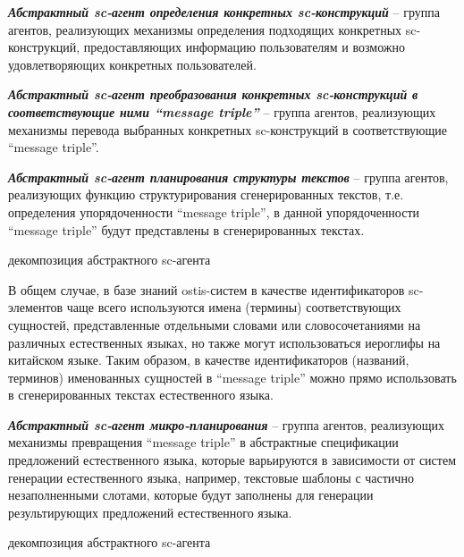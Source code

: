 \textit{\textbf{Абстрактный sc-агент определения конкретных sc-конструкций}} -- группа агентов, реализующих механизмы определения подходящих конкретных sc-конструкций, предоставляющих информацию пользователям и возможно удовлетворяющих конкретных пользователей. 

\textit{\textbf{Абстрактный sc-агент преобразования конкретных sc-конструкций в соответствующие ними ``message triple''}} -- группа агентов, реализующих механизмы перевода выбранных конкретных sc-конструкций в соответствующие ``message triple''.

\textit{\textbf{Абстрактный sc-агент планирования структуры текстов}} -- группа агентов, реализующих функцию структурирования сгенерированных текстов, т.е. определения упорядоченности ``message triple'', в данной упорядоченности ``message triple'' будут представлены в сгенерированных текстах. 
\begin{SCn}
	\begin{scnrelfromset}{декомпозиция абстрактного sc-агента}
	\end{scnrelfromset}
\end{SCn}

В общем случае, в базе знаний ostis-систем в качестве идентификаторов sc-элементов чаще всего используются имена (термины) соответствующих сущностей, представленные отдельными словами или словосочетаниями на различных естественных языках, но также могут использоваться иероглифы на китайском языке. Таким образом, в качестве идентификаторов (названий, терминов) именованных сущностей в ``message triple'' можно прямо использовать в сгенерированных текстах естественного языка. 

\textit{\textbf{Абстрактный sc-агент микро-планирования}} -- группа агентов, реализующих механизмы превращения ``message triple'' в абстрактные спецификации предложений естественного языка, которые варьируются в зависимости от систем генерации естественного языка, например, текстовые шаблоны с частично незаполненными слотами, которые будут заполнены для генерации результирующих предложений естественного языка.
\begin{SCn}
	\begin{scnrelfromset}{декомпозиция абстрактного sc-агента}
	\end{scnrelfromset}
\end{SCn}

